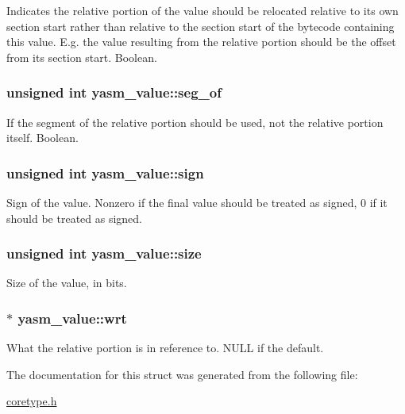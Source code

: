 Indicates the relative portion of the value should be relocated relative to its own section start rather than relative to the section start of the bytecode containing this value. E.\-g. the value resulting from the relative portion should be the offset from its section start. Boolean. \hypertarget{structyasm__value_a7c98791a8f0ea09712d820ee411efab4}{
\subsubsection[{seg\-\_\-of}]{\setlength{\rightskip}{0pt plus 5cm}unsigned int yasm\-\_\-value\-::seg\-\_\-of}}\label{structyasm__value_a7c98791a8f0ea09712d820ee411efab4}
If the segment of the relative portion should be used, not the relative portion itself. Boolean. \hypertarget{structyasm__value_a041ec908a206b4f83babed51b1ec9e8c}{
\subsubsection[{sign}]{\setlength{\rightskip}{0pt plus 5cm}unsigned int yasm\-\_\-value\-::sign}}\label{structyasm__value_a041ec908a206b4f83babed51b1ec9e8c}
Sign of the value. Nonzero if the final value should be treated as signed, 0 if it should be treated as signed. \hypertarget{structyasm__value_a16f95079ddc125cdea2210955a30c350}{
\subsubsection[{size}]{\setlength{\rightskip}{0pt plus 5cm}unsigned int yasm\-\_\-value\-::size}}\label{structyasm__value_a16f95079ddc125cdea2210955a30c350}
Size of the value, in bits. \hypertarget{structyasm__value_ac976e81c9a19ce934405d81d4f22bfcf}{
\subsubsection[{wrt}]{$\ast$ yasm\-\_\-value\-::wrt}}\label{structyasm__value_ac976e81c9a19ce934405d81d4f22bfcf}
What the relative portion is in reference to. N\-U\-L\-L if the default. 

The documentation for this struct was generated from the following file\-:\begin{DoxyCompactItemize}
\item 
\hyperlink{coretype_8h}{coretype.\-h}\end{DoxyCompactItemize}
